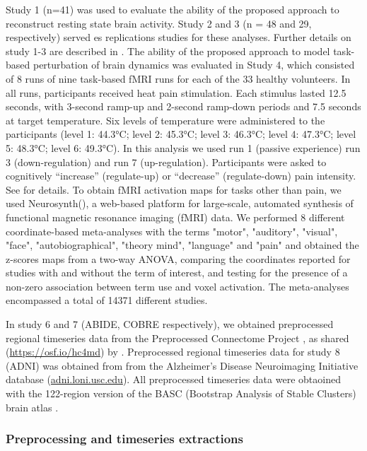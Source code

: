 \documentclass{article}
\begin{document}
Study 1 (n=41) was used to evaluate the ability of the proposed approach to reconstruct resting state brain activity. Study 2 and 3 (n = 48 and 29, respectively) served es replications studies for these analyses. Further details on study 1-3 are described in \cite{Spisak_2020}. The ability of the proposed approach to model task-based perturbation of brain dynamics was evaluated in Study 4, which consisted of 8 runs of nine task-based fMRI runs for each of the 33 healthy volunteers. In all runs, participants received heat pain stimulation. Each stimulus lasted 12.5 seconds, with 3-second ramp-up and 2-second ramp-down periods and 7.5 seconds at target temperature. Six levels of temperature were administered to the participants (level 1: 44.3°C; level 2: 45.3°C; level 3: 46.3°C; level 4: 47.3°C; level 5: 48.3°C; level 6: 49.3°C). In this analysis we used run 1 (passive experience)  run 3 (down-regulation) and run 7 (up-regulation). Participants were asked to cognitively ``increase'' (regulate-up) or ``decrease'' (regulate-down) pain intensity. See \citet{woo2015distinct} for details.
To obtain fMRI activation maps for tasks other than pain, we used Neurosynth(\cite{Tor_D__2011}), a web-based platform for large-scale, automated synthesis of functional magnetic resonance imaging (fMRI) data. We performed 8 different coordinate-based meta-analyses with the terms "motor", "auditory", "visual", "face", "autobiographical", "theory mind", "language" and "pain" and obtained the z-scores maps from a two-way ANOVA, comparing the coordinates reported for studies with and without the term of interest, and testing for the presence of a non-zero association between term use and voxel activation. The meta-analyses encompassed a total  of 14371 different studies.

In study 6 and 7 (ABIDE, COBRE respectively), we obtained preprocessed regional timeseries data from the Preprocessed Connectome Project \citep{craddock2013towards}, as shared (\href{https://osf.io/hc4md}{https://osf.io/hc4md}) by \citet{dadi2019benchmarking}. Preprocessed regional timeseries data for study 8 (ADNI) was obtained from from the Alzheimer's Disease Neuroimaging Initiative database (\href{http://adni.loni.usc.edu}{adni.loni.usc.edu}). All preprocessed timeseries data were obtaoined with the 122-region version of the BASC (Bootstrap Analysis of Stable Clusters) brain atlas \citep{bellec2010multi}.

\subsubsection{Preprocessing and timeseries extractions}\label{Preprocessing and timeseries extractions}
\end{document}
